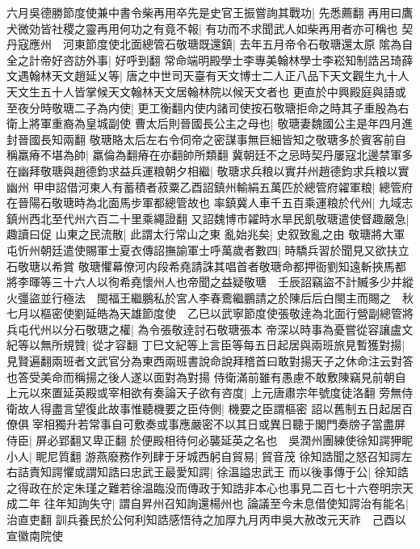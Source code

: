 六月吳德勝節度使兼中書令柴再用卒先是史官王振嘗詢其戰功|{
	先悉薦翻}
再用曰鷹犬微効皆社稷之靈再用何功之有竟不報|{
	有功而不求聞武人如柴再用者亦可稱也}
契丹寇應州　河東節度使北面總管石敬瑭既還鎮|{
	去年五月帝令石敬瑭還太原}
隂為自全之計帝好咨訪外事|{
	好呼到翻}
常命端明殿學士李專美翰林學士李崧知制誥呂琦薛文遇翰林天文趙延乂等|{
	唐之中世司天臺有天文博士二人正八品下天文觀生九十人天文生五十人皆掌候天文翰林天文居翰林院以候天文者也}
更直於中興殿庭與語或至夜分時敬瑭二子為内使|{
	更工衡翻内使内諸司使按石敬瑭拒命之時其子重殷為右衛上將軍重裔為皇城副使}
曹太后則晉國長公主之母也|{
	敬瑭妻魏國公主是年四月進封晉國長知兩翻}
敬瑭賂太后左右令伺帝之密謀事無巨細皆知之敬瑭多於賓客前自稱羸瘠不堪為帥|{
	羸倫為翻瘠在亦翻帥所類翻}
冀朝廷不之忌時契丹屢寇北邊禁軍多在幽拜敬瑭與趙德鈞求益兵運粮朝夕相繼|{
	敬瑭求兵粮以實幷州趙德鈞求兵粮以實幽州}
甲申詔借河東人有蓄積者菽粟乙酉詔鎮州輸絹五萬匹於總管府糴軍粮|{
	總管府在晉陽石敬瑭時為北面馬步軍都總管故也}
率鎮冀人車千五百乘運粮於代州|{
	九域志鎮州西北至代州六百二十里乘繩證翻}
又詔魏博市糴時水旱民飢敬瑭遣使督趣嚴急|{
	趣讀曰促}
山東之民流散|{
	此謂太行常山之東}
亂始兆矣|{
	史叙致亂之由}
敬瑭將大軍屯忻州朝廷遣使賜軍士夏衣傳詔撫諭軍士呼萬歲者數四|{
	時驕兵習於聞見又欲扶立石敬瑭以希賞}
敬瑭懼幕僚河内段希堯請誅其唱首者敬瑭命都押衙劉知遠斬挾馬都將李暉等三十六人以徇希堯懷州人也帝聞之益疑敬瑭　壬辰詔竊盜不計贓多少并縱火彊盜並行極法　閩福王繼鵬私於宮人李春鷰繼鵬請之於陳后后白閩主而賜之　秋七月以樞密使劉延皓為天雄節度使　乙巳以武寧節度使張敬逹為北面行營副總管將兵屯代州以分石敬瑭之權|{
	為令張敬逹討石敬瑭張本}
帝深以時事為憂嘗從容讓盧文紀等以無所規贊|{
	從才容翻}
丁巳文紀等上言臣等每五日起居與兩班旅見暫獲對揚|{
	見賢遍翻兩班者文武官分為東西兩班書說命說拜稽首曰敢對揚天子之休命注云對答也答受美命而稱揚之後人遂以面對為對揚}
侍衛滿前雖有愚慮不敢敷陳竊見前朝自上元以來置延英殿或宰相欲有奏論天子欲有咨度|{
	上元唐肅宗年號度徒洛翻}
旁無侍衛故人得盡言望復此故事惟聽機要之臣侍側|{
	機要之臣謂樞密}
詔以舊制五日起居百僚俱宰相獨升若常事自可敷奏或事應嚴密不以其日或異日聽于閣門奏牓子當盡屏侍臣|{
	屏必郢翻又卑正翻}
於便殿相待何必襲延英之名也　吳潤州團練使徐知諤狎眤小人|{
	眤尼質翻}
游燕廢務作列肆于牙城西躬自貿易|{
	貿音茂}
徐知誥聞之怒召知諤左右詰責知諤懼或謂知誥曰忠武王最愛知諤|{
	徐温謚忠武王}
而以後事傳于公|{
	徐知誥之得政在於定朱瑾之難若徐温臨没而傳政于知誥非本心也事見二百七十六卷明宗天成二年}
往年知詢失守|{
	謂自昇州召知詢還楊州也}
論議至今未息借使知諤治有能名|{
	治直吏翻}
訓兵養民於公何利知誥感悟待之加厚九月丙申吳大赦改元天祚　己酉以宣徽南院使

